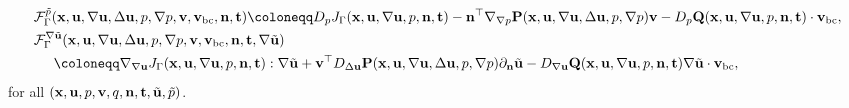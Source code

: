 \documentclass[oneside,11pt]{book}
\numberwithin{equation}{section}
\begin{document}
\begin{itemize}[leftmargin=0in]
\begin{align*}
        &\mathcal{F}_\Gamma^{\tilde{p}}({\bf x},{\bf u},\nabla{\bf u},\Delta{\bf u},p,\nabla p,{\bf v},{\bf v}_{\rm bc},{\bf n},{\bf t})\coloneqq D_pJ_\Gamma({\bf x},{\bf u},\nabla{\bf u},p,{\bf n},{\bf t}) - {\bf n}^\top\nabla_{\nabla p}{\bf P}({\bf x},{\bf u},\nabla{\bf u},\Delta{\bf u},p,\nabla p){\bf v} - D_p{\bf Q}({\bf x},{\bf u},\nabla{\bf u},p,{\bf n},{\bf t})\cdot{\bf v}_{\rm bc},\\
        &\mathcal{F}_\Gamma^{\nabla\tilde{\bf u}}({\bf x},{\bf u},\nabla{\bf u},\Delta{\bf u},p,\nabla p,{\bf v},{\bf v}_{\rm bc},{\bf n},{\bf t},\nabla\tilde{\bf u})\\
        &\hspace{5mm}\coloneqq\nabla_{\nabla{\bf u}}J_\Gamma({\bf x},{\bf u},\nabla{\bf u},p,{\bf n},{\bf t}):\nabla\tilde{\bf u} + {\bf v}^\top D_{\Delta{\bf u}}{\bf P}({\bf x},{\bf u},\nabla{\bf u},\Delta{\bf u},p,\nabla p)\partial_{\bf n}\tilde{\bf u} - D_{\nabla{\bf u}}{\bf Q}({\bf x},{\bf u},\nabla{\bf u},p,{\bf n},{\bf t})\nabla\tilde{\bf u}\cdot{\bf v}_{\rm bc},
    \end{align*}
    for all $({\bf x},{\bf u},p,{\bf v},q,{\bf n},{\bf t},\tilde{\bf u},\tilde{p})$.
    

\end{itemize}
\end{document}
